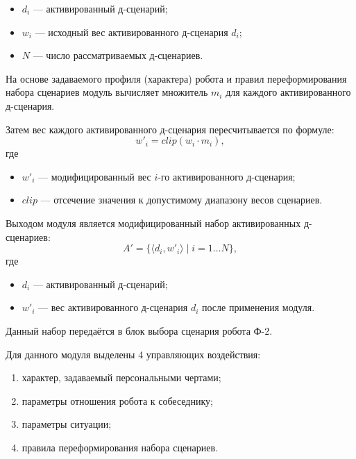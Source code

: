 \begin{itemize}
	\item \(d_i\) --- активированный д-сценарий;
	\item \(w_i\) --- исходный вес активированного д-сценария \(d_i\);
	\item \(N\) --- число рассматриваемых д-сценариев.
\end{itemize}

На основе задаваемого профиля (характера) робота и правил переформирования набора сценариев модуль вычисляет множитель \(m_i\) для каждого активированного д-сценария.

Затем вес каждого активированного д-сценария пересчитывается по формуле:
\begin{equation}
	\label{eq:modified_weight}
	w'_i = clip(w_i \cdot m_i),
\end{equation}
где

\begin{itemize}
	\item \(w'_i\) --- модифицированный вес \(i\)-го активированного д-сценария;
	\item \(clip\) --- отсечение значения к допустимому диапазону весов сценариев.
\end{itemize}

Выходом модуля является модифицированный набор активированных д-сценариев:
\begin{equation}
	\label{eq:method_output}
	A' = \{\langle d_i, w'_i \rangle \mid i = 1 \dots N\},
\end{equation}
где

\begin{itemize}
	\item \(d_i\) --- активированный д-сценарий;
	\item \(w'_i\) --- вес активированного д-сценария \(d_i\) после применения модуля.
\end{itemize}

Данный набор передаётся в блок выбора сценария робота Ф-2.

Для данного модуля выделены 4 управляющих воздействия:
\begin{enumerate}
	\item характер, задаваемый персональными чертами;
	\item параметры отношения робота к собеседнику;
	\item параметры ситуации;
	\item правила переформирования набора сценариев.
\end{enumerate}

